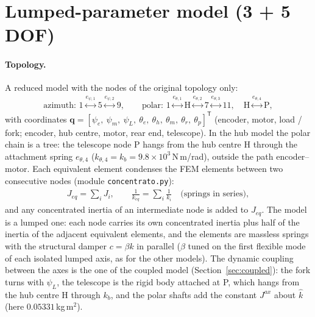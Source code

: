 \documentclass[10pt,a4paper]{article}
\numberwithin{equation}{section}
\begin{document}
\section{Lumped-parameter model (3 + 5 DOF)}\label{sec:lumped}
\paragraph{Topology.} A reduced model with the nodes of the original topology only:
\begin{gather}
\text{azimuth: } 1 \overset{e_{\psi,1}}{\longleftrightarrow} 5 \overset{e_{\psi,2}}{\longleftrightarrow} 9, \qquad \text{polar: } 1 \overset{e_{\theta,1}}{\longleftrightarrow} \mathrm H \overset{e_{\theta,2}}{\longleftrightarrow} 7 \overset{e_{\theta,3}}{\longleftrightarrow} 11,\quad \mathrm H \overset{e_{\theta,4}}{\longleftrightarrow} \mathrm P,
\end{gather}
with coordinates $\mathbf q = [\psi_e,\ \psi_m,\ \psi_L,\ \theta_e,\ \theta_h,\ \theta_m,\ \theta_r,\ \theta_p]^{\mathsf T}$ (encoder, motor, load / fork; encoder, hub centre, motor, rear end, telescope). In the hub model the polar chain is a tree: the telescope node P hangs from the hub centre H through the attachment spring $e_{\theta,4}$ ($k_{\theta,4} = k_b = 9.8\times10^{3}$\,N\,m/rad), outside the path encoder--motor. Each equivalent element condenses the FEM elements between two consecutive nodes (module \texttt{concentrato.py}):
\begin{gather}
J_{eq} = \sum_i J_i, \qquad \frac{1}{k_{eq}} = \sum_i\frac{1}{k_i}\quad\text{(springs in series)},
\end{gather}
and any concentrated inertia of an intermediate node is added to $J_{eq}$. The model is a lumped one: each node carries its own concentrated inertia plus half of the inertia of the adjacent equivalent elements, and the elements are massless springs with the structural damper $c = \beta k$ in parallel ($\beta$ tuned on the first flexible mode of each isolated lumped axis, as for the other models). The dynamic coupling between the axes is the one of the coupled model (Section~\ref{sec:coupled}): the fork turns with $\psi_L$, the telescope is the rigid body attached at P, which hangs from the hub centre H through $k_b$, and the polar shafts add the constant $J^{ax}$ about $\hat k$ (here $0.05331$\,kg\,m$^2$).
\end{document}

